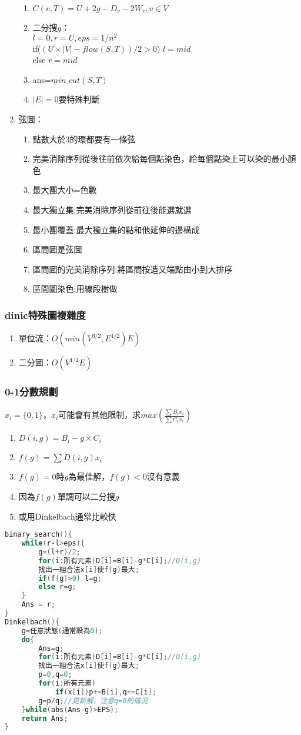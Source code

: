\begin{enumerate}
\begin{enumerate}
	\item $C(v,T)=U+2g-D_v-2W_v ,v \in V$
	\item 二分搜$g$：\\$l=0,r=U,eps=1/n^2$\\if($(U\times|V|-flow(S,T))/2>0$) $l=mid$\\else $r=mid$
	\item ans=$min\_cut(S,T)$
	\item $|E|=0$要特殊判斷
	\end{enumerate}
\item 弦圖：
	\begin{enumerate}\itemsep = -3pt
	\item 點數大於3的環都要有一條弦
	\item 完美消除序列從後往前依次給每個點染色，給每個點染上可以染的最小顏色
	\item 最大團大小=色數
	\item 最大獨立集:完美消除序列從前往後能選就選
	\item 最小團覆蓋:最大獨立集的點和他延伸的邊構成
	\item 區間圖是弦圖
	\item 區間圖的完美消除序列:將區間按造又端點由小到大排序
	\item 區間圖染色:用線段樹做
	\end{enumerate}
\end{enumerate}
\subsubsection{dinic特殊圖複雜度}
\begin{enumerate}\itemsep = -5pt
\item 單位流：$O\left(min\left(V^{3/2},E^{1/2}\right)E\right)$
\item 二分圖：$O\left(V^{1/2}E\right)$
\end{enumerate}

\subsubsection{0-1分數規劃}
$x_i=\{0,1\}$，$x_i$可能會有其他限制，求$max\left(\frac{\sum B_ix_i}{\sum C_ix_i}\right)$
\begin{enumerate}\itemsep = -1pt
\item $D(i,g)=B_i-g\times C_i$
\item $f(g)=\sum D(i,g)x_i$
\item $f(g)=0$時$g$為最佳解，$f(g)<0$沒有意義
\item 因為$f(g)$單調可以二分搜$g$
\item 或用Dinkelbach通常比較快
\end{enumerate}
\begin{lstlisting}[language=C++]
binary_search(){
	while(r-l>eps){
		g=(l+r)/2;
		for(i:所有元素)D[i]=B[i]-g*C[i];//D(i,g) 
		找出一組合法x[i]使f(g)最大;
		if(f(g)>0) l=g;
		else r=g;
	}
	Ans = r;
}
Dinkelbach(){
	g=任意狀態(通常設為0);
	do{
		Ans=g;
		for(i:所有元素)D[i]=B[i]-g*C[i];//D(i,g) 
		找出一組合法x[i]使f(g)最大;
		p=0,q=0;
		for(i:所有元素)
			if(x[i])p+=B[i],q+=C[i];
		g=p/q;//更新解，注意q=0的情況 
	}while(abs(Ans-g)>EPS);
	return Ans;
}
\end{lstlisting}

